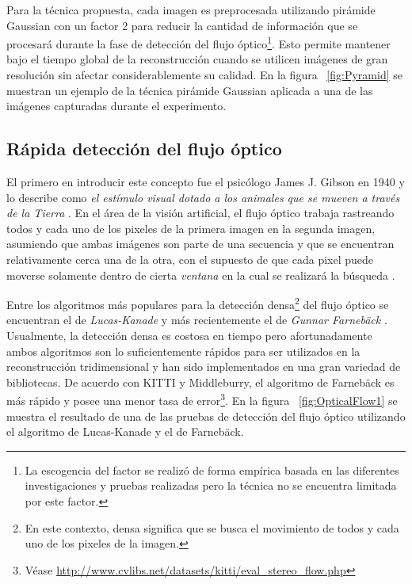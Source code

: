 Para la t\'{e}cnica propuesta, cada imagen es preprocesada utilizando pir\'{a}mide Gaussian con un factor 2 para reducir la cantidad de informaci\'{o}n que se procesar\'{a} durante la fase de detecci\'{o}n del flujo \'{o}ptico\footnote{La escogencia del factor se realiz\'{o} de forma emp\'{i}rica basada en las diferentes investigaciones y pruebas realizadas pero la t\'{e}cnica no se encuentra limitada por este factor.}. Esto permite mantener bajo el tiempo global de la reconstrucci\'{o}n cuando se utilicen im\'{a}genes de gran resoluci\'{o}n sin afectar considerablemente su calidad. En la figura ~\ref{fig:Pyramid} se muestran un ejemplo de la t\'{e}cnica pir\'{a}mide Gaussian aplicada a una de las im\'{a}genes capturadas durante el experimento.


\subsection{R\'{a}pida detecci\'{o}n del flujo \'{o}ptico}
El primero en introducir este concepto fue el psic\'{o}logo James J. Gibson en 1940 y lo describe como \textit{el est\'{i}mulo visual dotado a los animales que se mueven a trav\'{e}s de la Tierra} \cite{Gibson_1950}. En el \'{a}rea de la visi\'{o}n artificial, el flujo \'{o}ptico trabaja rastreando todos y cada uno de los pixeles de la primera imagen en la segunda imagen, asumiendo que ambas im\'{a}genes son parte de una secuencia y que se encuentran relativamente cerca una de la otra, con el supuesto de que cada pixel puede moverse solamente dentro de cierta \textit{ventana} en la cual se realizar\'{a} la b\'{u}squeda \cite{Gibson_1950,Shapiro_Stockman_2001,Szeliski_2010,Cyganek_Siebert_2009}.

Entre los algoritmos m\'{a}s populares para la detecci\'{o}n densa\footnote{En este contexto, densa significa que se busca el movimiento de todos y cada uno de los pixeles de la imagen.} del flujo \'{o}ptico se encuentran el de \textit{Lucas-Kanade} \cite{Lucas_Kanade_1981} y m\'{a}s recientemente el de \textit{Gunnar Farnebäck} \cite{Farneback_2003}. Usualmente, la detecci\'{o}n densa es costosa en tiempo pero afortunadamente ambos algoritmos son lo suficientemente r\'{a}pidos para ser utilizados en la reconstrucci\'{o}n tridimensional y han sido implementados en una gran variedad de bibliotecas. De acuerdo con KITTI y Middleburry, el algoritmo de Farnebäck es m\'{a}s r\'{a}pido y posee una menor tasa de error\footnote{V\'{e}ase \url{http://www.cvlibs.net/datasets/kitti/eval_stereo_flow.php}}. En la figura ~\ref{fig:OpticalFlow1} se muestra el resultado de una de las pruebas de detecci\'{o}n del flujo \'{o}ptico utilizando el algoritmo de Lucas-Kanade y el de Farnebäck.


